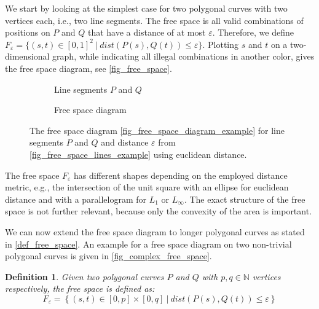 \documentclass[
oneside,
fontsize=11pt
]{scrartcl}
\newtheorem{mydef}{Definition}
\begin{document}
We start by looking at the simplest case for two polygonal curves with two vertices each, i.e., two line segments.
The free space is all valid combinations of positions on $P$ and $Q$ that have a distance of at most $\varepsilon$.
Therefore, we define $F_\varepsilon = \{(s,t) \in [0,1]^2 \ | \ dist(P(s), Q(t)) \leq \varepsilon \}$.
Plotting $s$ and $t$ on a two-dimensional graph, while indicating all illegal combinations in 
another color, gives the free space diagram, see \autoref{fig_free_space}. \cite{alt_computing_1995}

\begin{figure}[ht]
  \centering
  \begin{subfigure}[b]{0.45\textwidth}
      \resizebox{\textwidth}{!}{
        
      }
      \caption{Line segments $P$ and $Q$}
      \label{fig_free_space_lines_example}
  \end{subfigure}
  \hfill
  \begin{subfigure}[b]{0.45\textwidth}
      \resizebox{\textwidth}{!}{
        
      }
      \caption{Free space diagram}
      \label{fig_free_space_diagram_example}
  \end{subfigure}
  \caption[Free space diagram example]{
    The free space diagram \autoref{fig_free_space_diagram_example} 
    for line segments $P$ and $Q$ and distance $\varepsilon$
    from \autoref{fig_free_space_lines_example} using euclidean distance.}
  \label{fig_free_space}
\end{figure}

The free space $F_\varepsilon$ has different shapes depending on the employed distance metric,
e.g.,  the intersection of the unit square with an ellipse for euclidean distance 
and with a parallelogram for $L_1$ or $L_\infty$. 
The exact structure of the free space is not further relevant, 
because only the convexity of the area is important. \cite{alt_computing_1995}

We can now extend the free space diagram to longer polygonal curves 
as stated in \autoref{def_free_space}.
An example for a free space diagram on two non-trivial polygonal curves is given in \autoref{fig_complex_free_space}.

\begin{mydef}
  \label{def_free_space}
  Given two polygonal curves $P$ and $Q$ with $p,q \in \mathbb{N}$ vertices respectively, 
  the free space is defined as:
  $$F_\varepsilon = \left\{ (s,t) \in [0,p] \times [0,q] \ | \ dist(P(s), Q(t)) \leq \varepsilon \right\}$$
\end{mydef}
\end{document}
